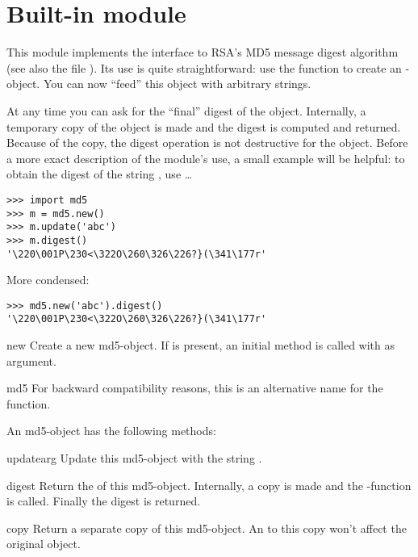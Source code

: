 \section{Built-in module }

This module implements the interface to RSA's MD5 message digest
algorithm (see also the file ). Its use is quite
straightforward: use the function  to create an
-object. You can now ``feed'' this object with arbitrary
strings.

At any time you can ask for the ``final'' digest of the object. Internally,
a temporary copy of the object is made and the digest is computed and
returned. Because of the copy, the digest operation is not destructive
for the object. Before a more exact description of the module's use, a small
example will be helpful: 
to obtain the digest of the string , use \ldots

\bcode\begin{verbatim}
>>> import md5
>>> m = md5.new()
>>> m.update('abc')
>>> m.digest()
'\220\001P\230<\322O\260\326\226?}(\341\177r'
\end{verbatim}\ecode

More condensed:

\bcode\begin{verbatim}
>>> md5.new('abc').digest()
'\220\001P\230<\322O\260\326\226?}(\341\177r'
\end{verbatim}\ecode

\renewcommand{\indexsubitem}{(in module md5)}

\begin{funcdesc}{new}{}
  Create a new md5-object. If  is present, an initial
   method is called with  as argument.
\end{funcdesc}

\begin{funcdesc}{md5}{}
For backward compatibility reasons, this is an alternative name for the
 function.
\end{funcdesc}

An md5-object has the following methods:

\renewcommand{\indexsubitem}{(md5 method)}
\begin{funcdesc}{update}{arg}
  Update this md5-object with the string .
\end{funcdesc}

\begin{funcdesc}{digest}{}
  Return the  of this md5-object. Internally, a copy is made
  and the \C-function  is called. Finally the digest is
  returned.
\end{funcdesc}

\begin{funcdesc}{copy}{}
  Return a separate copy of this md5-object.  An  to this
  copy won't affect the original object.
\end{funcdesc}
